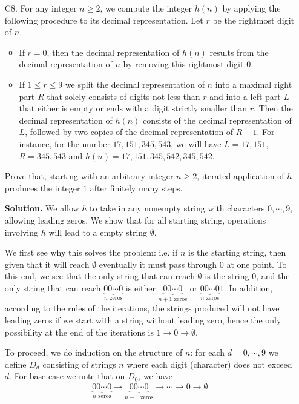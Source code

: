 \documentclass[11pt,a4paper]{article}
\begin{document}
\begin{enumerate}
    	\item[C8.]
    	For any integer $n\geq 2$, we compute the integer $h(n)$ by applying the following procedure to its decimal representation. Let $r$ be the rightmost digit of $n$.
    	\begin{itemize}
    		\item If $r=0$, then the decimal representation of $h(n)$ results from the decimal representation of $n$ by removing this rightmost digit $0$.
    		
    		\item If $1\leq r \leq 9$ we split the decimal representation of $n$ into a maximal right part $R$ that solely consists of digits not less than $r$ and into a left part $L$ that either is empty or ends with a digit strictly smaller than $r$. Then the decimal representation of $h(n)$ consists of the decimal representation of $L$, followed by two copies of the decimal representation of $R-1$. For instance, for the number $17,151,345,543$, we will have $L=17,151$, $R=345,543$ and $h(n)=17,151,345,542,345,542$.
    	\end{itemize}
        
        Prove that, starting with an arbitrary integer $n\geq 2$, iterated application of $h$ produces the integer $1$ after finitely many steps.
        
        \textbf{Solution.} 
        We allow $h$ to take in any nonempty string with characters $0, \cdots, 9$, allowing leading zeros. We show that for all starting string, operations involving $h$ will lead to a empty string $\emptyset$. 
        
        We first see why this solves the problem: i.e. if $n$ is the starting string, then given that it will reach $\emptyset$ eventually it must pass through 0 at one point. 
        To this end, we see that the only string that can reach $\emptyset$ is the string 0, 
        and the only string that can reach $\underbrace{00\cdots 0}_{n\text{ zeros}}$ is either $\underbrace{00\cdots 0}_{n + 1\text{ zeros}}$
        or $\underbrace{00\cdots 0}_{n\text{ zeros}}1$. 
        In addition, according to the rules of the iterations, the strings produced will not have leading zeros if we start with a string without leading zero, 
        hence the only possibility at the end of the iterations is $1\to 0\to\emptyset$. 
        
        To proceed, we do induction on the structure of $n$: 
        for each $d=0, \cdots, 9$ we define $D_d$ consisting of strings $n$ where each digit (character) does not exceed $d$. 
        For base case we note that on $D_0$, we have 
        \[
        \underbrace{00\cdots 0}_{n\text{ zeros}}\to \underbrace{00\cdots 0}_{n - 1\text{ zeros}}\to\cdots \to 0\to\emptyset
        \]
        

\end{enumerate}
\end{document}
